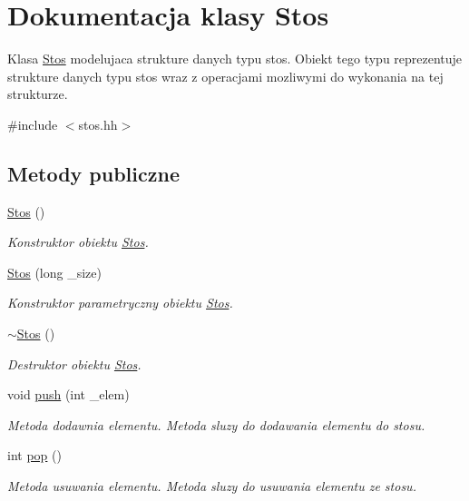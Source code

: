 \hypertarget{class_stos}{\section{Dokumentacja klasy Stos}
\label{class_stos}
}


Klasa \hyperlink{class_stos}{Stos} modelujaca strukture danych typu stos. Obiekt tego typu reprezentuje strukture danych typu stos wraz z operacjami mozliwymi do wykonania na tej strukturze.  




{\ttfamily \#include $<$stos.\-hh$>$}

\subsection*{Metody publiczne}
\begin{DoxyCompactItemize}
\item 
\hyperlink{class_stos_a1de3b50386d5dfb56ddece17d0ea2389}{Stos} ()
\begin{DoxyCompactList}\small\item\em Konstruktor obiektu \hyperlink{class_stos}{Stos}. \end{DoxyCompactList}\item 
\hyperlink{class_stos_a6606affc11eed2b059b8caf287ffca25}{Stos} (long \-\_\-size)
\begin{DoxyCompactList}\small\item\em Konstruktor parametryczny obiektu \hyperlink{class_stos}{Stos}. \end{DoxyCompactList}\item 
\hyperlink{class_stos_af9a198e2540e18adcc0b5259105fd78e}{$\sim$\-Stos} ()
\begin{DoxyCompactList}\small\item\em Destruktor obiektu \hyperlink{class_stos}{Stos}. \end{DoxyCompactList}\item 
void \hyperlink{class_stos_afd5802e405946328cccca3eed676b493}{push} (int \-\_\-elem)
\begin{DoxyCompactList}\small\item\em Metoda dodawnia elementu. Metoda sluzy do dodawania elementu do stosu. \end{DoxyCompactList}\item 
int \hyperlink{class_stos_aabb14b8a389c55da6e2b50fbb179ed56}{pop} ()
\begin{DoxyCompactList}\small\item\em Metoda usuwania elementu. Metoda sluzy do usuwania elementu ze stosu. \end{DoxyCompactList}\item 

\end{DoxyCompactItemize}
